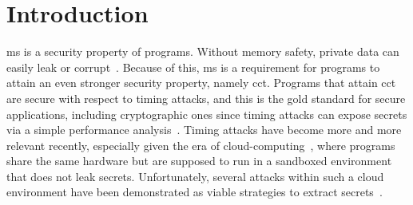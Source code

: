 \documentclass[utf8,acmsmall,review,screen,dvipsnames]{acmart}
\begin{document}
\maketitle

\section{Introduction}\label{sec:introduction}

\gls{ms} is a security property of programs.
Without memory safety, private data can easily leak or corrupt~\cite{lemay2021ccc}.
Because of this, \gls{ms} is a requirement for programs to attain an even stronger security property, namely \gls{cct}.
Programs that attain \gls{cct} are secure with respect to timing attacks, and this is the gold standard for secure applications, including cryptographic ones since timing attacks can expose secrets via a simple performance analysis~\cite{kocher1996timing}.
Timing attacks have become more and more relevant recently, especially given the era of cloud-computing~\cite{aviram2010cloudtime,kumar2019cloudsecsurvey}, where programs share the same hardware but are supposed to run in a sandboxed environment that does not leak secrets.
Unfortunately, several attacks within such a cloud environment have been demonstrated as viable strategies to extract secrets~\cite{mehmet2015getoff,flowers2022zeroday,atya2019catchme,venkatanathan2015placevul}.
\end{document}
